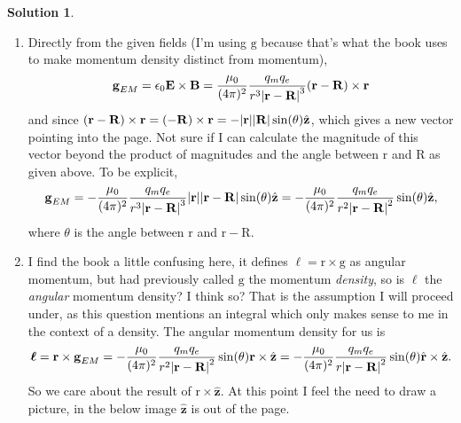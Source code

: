 \documentclass[10pt]{article}
\theoremstyle{definition}
\newtheorem{soln}{Solution}
\newcommand{\uz}{\hat{\mathbf{z}}}
\newcommand{\uv}[1]{\hat{\bv{{#1}}}}
\newcommand{\bv}[1]{\bm{\mathrm{#1}}}
\begin{document}
\begin{soln}
  \begin{enumerate}[label=(\alph*)]
    \item Directly from the given fields (I'm using $\bv{g}$ because that's what the book uses to make momentum density distinct from momentum),
          $$\bv{g}_{EM}=\epsilon_0\bv{E}\times\bv{B}=\frac{\mu_0}{(4\pi)^2}\frac{q_mq_e}{r^3\abs{\bv{r}-\bv{R}}^3}(\bv{r}-\bv{R})\times\bv{r}$$
          and since $(\bv{r}-\bv{R})\times\bv{r}=(-\bv{R})\times\bv{r}=-\abs{\bv{r}}\abs{\bv{R}}\sin(\theta)\uz$, which gives a new vector pointing into the page.
          Not sure if I can calculate the magnitude of this vector beyond the product of magnitudes and the angle between $\bv{r}$ and $\bv{R}$ as given above.
          To be explicit,
          $$\bv{g}_{EM}=-\frac{\mu_0}{(4\pi)^2}\frac{q_mq_e}{r^3\abs{\bv{r}-\bv{R}}^3}\abs{\bv{r}}\abs{\bv{r}-\bv{R}}\sin(\theta)\uz=
            -\frac{\mu_0}{(4\pi)^2}\frac{q_mq_e}{r^2\abs{\bv{r}-\bv{R}}^2}\sin(\theta)\uz,$$
          where $\theta$ is the angle between $\bv{r}$ and $\bv{r}-\bv{R}$.
    \item I find the book a little confusing here, it defines $\bv{\ell}=\bv{r}\times\bv{g}$ as angular momentum, but had previously called $\bv{g}$ the
          momentum \emph{density}, so is $\bv{\ell}$ the \emph{angular} momentum density? I think so? That is the assumption I will proceed under,
          as this question mentions an integral which only makes sense to me in the context of a density. The angular momentum density for us is
          $$\bv{\ell}=\bv{r}\times\bv{g}_{EM}=-\frac{\mu_0}{(4\pi)^2}\frac{q_mq_e}{r^2\abs{\bv{r}-\bv{R}}^2}\sin(\theta)\bv{r}\times\uz=-\frac{\mu_0}{(4\pi)^2}\frac{q_mq_e}{r\abs{\bv{r}-\bv{R}}^2}\sin(\theta)\uv{r}\times\uz.$$
          So we care about the result of $\bv{r}\times\uz$. At this point I feel the need to draw a picture, in the below image $\uz$ is out of the page.
          \begin{center}
\end{center}
\end{enumerate}
\end{soln}
\end{document}
